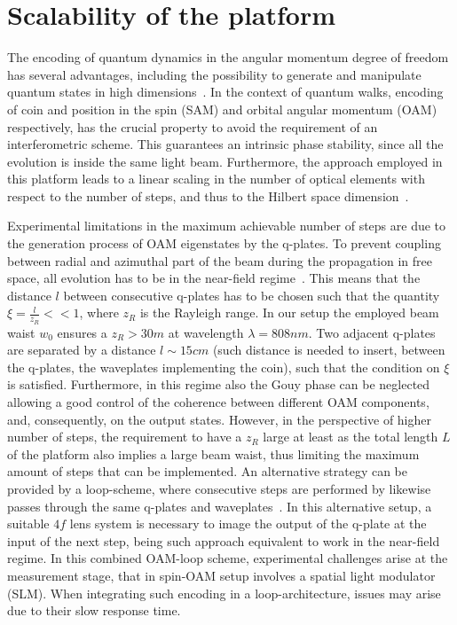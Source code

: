 \section{Scalability of the platform}
\label{sec:expQWs:scalability}


The encoding of quantum dynamics in the angular momentum degree of freedom has several advantages, including the possibility to generate and manipulate quantum states in high dimensions~\cite{fickler2012quantum,dambrosio2013photonic}. In the context of quantum walks, encoding of coin and position in the spin (SAM) and orbital angular momentum (OAM) respectively, has the crucial property to avoid the requirement of an interferometric scheme. This guarantees an intrinsic phase stability, since all the evolution is inside the same light beam. Furthermore, the approach employed in this platform leads to a linear scaling in the number of optical elements with respect to the number of steps, and thus to the Hilbert space dimension~\cite{cardano2015quantum}.

Experimental limitations in the maximum achievable number of steps 
are due to the generation process of OAM eigenstates by the q-plates. To prevent coupling between radial and azimuthal part of the beam during the propagation in free space, all evolution has to be in the near-field regime~\cite{karimi2009light, cardano2015quantum}. This means that the distance $l$ between consecutive q-plates has to be chosen such that the quantity $\xi=\frac{l}{z_R}< < 1 $, where $z_R$ is the Rayleigh range.
In our setup the employed beam waist $w_0$  ensures a $z_R> 30 m$ at wavelength $\lambda=808 nm$. Two adjacent q-plates are separated by a distance $l \sim 15 cm$ (such distance is needed to insert, between the q-plates, the waveplates implementing the coin), such that the condition on $\xi$ is satisfied.  Furthermore, in this regime also the Gouy phase can be neglected allowing a good control of the coherence between different OAM components, and, consequently, on the output states. However, in the perspective of higher number of steps, the requirement to have a $z_R$ large at least as the total length $L$ of the platform also implies a large beam waist, thus limiting the maximum amount of steps that can be implemented. An alternative strategy can be provided by a loop-scheme, where consecutive steps are performed by likewise passes through the same q-plates and waveplates~\cite{goyal2013implementing}. In this alternative setup, a suitable $4f$ lens system is necessary to image the output of the q-plate at the input of the next step, being such approach equivalent to work in the near-field regime.  
In this combined OAM-loop scheme, experimental challenges arise at the measurement stage, that in spin-OAM setup involves a spatial light modulator (SLM). When integrating such encoding in a loop-architecture, issues may arise due to their slow response time.


